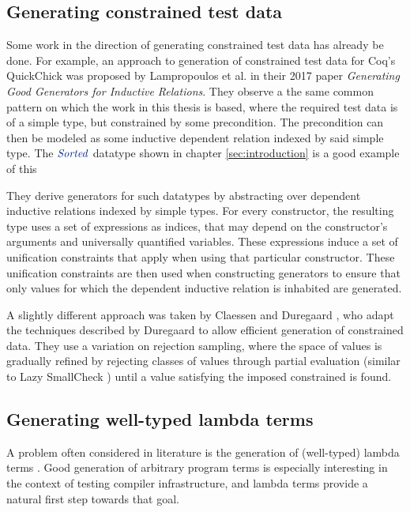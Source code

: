 \documentclass[a4paper,msc,twosized=semi]{uustthesis}
\newcommand*{\mathcolor}{}
\def\mathcolor#1#{\mathcoloraux{#1}}
\newcommand*{\mathcoloraux}[3]{%
  \protect\leavevmode
  \begingroup
    \color#1{#2}#3%
  \endgroup
}
\newcommand{\HSCon}[1]{\mathcolor{hsblue3}{\mathit{#1}}}
\begin{document}
\subsection{Generating constrained test data}

  Some work in the direction of generating constrained test data has already be done. 
  For example, an approach to generation of constrained test data for Coq's QuickChick 
  was proposed by Lampropoulos et al. \cite{lampropoulos2017generating} in their 2017 
  paper \textit{Generating Good Generators for Inductive Relations}. They observe a 
  the same common pattern on which the work in this thesis is based, where the required 
  test data is of a simple type, but constrained by some precondition. The precondition 
  can then be modeled as some inductive dependent relation indexed by said simple type. 
  The \ensuremath{\HSCon{Sorted}} datatype shown in chapter \ref{sec:introduction} is a good example of 
  this

  They derive generators for such datatypes by abstracting over dependent inductive 
  relations indexed by simple types. For every constructor, the resulting type uses a 
  set of expressions as indices, that may depend on the constructor's arguments and 
  universally quantified variables. These expressions induce a set of unification 
  constraints that apply when using that particular constructor. These unification 
  constraints are then used when constructing generators to ensure that only values 
  for which the dependent inductive relation is inhabited are generated. 

  A slightly different approach was taken by Claessen and Duregaard 
  \cite{claessen2015generating}, who adapt the techniques described 
  by Duregaard \cite{duregaard2013feat} to allow efficient generation of constrained 
   data. They use a variation on rejection sampling, where the space of values is 
  gradually refined by rejecting classes of values through partial evaluation 
  (similar to Lazy SmallCheck \cite{runciman2008smallcheck}) until a value satisfying 
  the imposed constrained is found. 

\subsection{Generating well-typed lambda terms}

  A problem often considered in literature is the generation of (well-typed) lambda 
  terms \cite{palka2011testing, grygiel2013counting, claessen2015generating}. Good 
  generation of arbitrary program terms is especially interesting in the context of 
  testing compiler infrastructure, and lambda terms provide a natural first step 
  towards that goal. 
\end{document}
